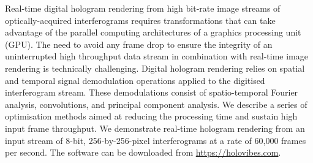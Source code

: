 Real-time digital hologram rendering from high bit-rate image streams of optically-acquired interferograms requires transformations that can take advantage of the parallel computing architectures of a graphics processing unit (GPU). The need to avoid any frame drop to ensure the integrity of an uninterrupted high throughput data stream in combination with real-time image rendering is technically challenging. Digital hologram rendering relies on spatial and temporal signal demodulation operations applied to the digitised interferogram stream. These demodulations consist of spatio-temporal Fourier analysis, convolutions, and principal component analysis. We describe a series of optimisation methods aimed at reducing the processing time and sustain high input frame throughput. We demonstrate real-time hologram rendering from an input stream of 8-bit, 256-by-256-pixel interferograms at a rate of 60,000 frames per second. The software can be downloaded from \href{https://holovibes.com}{https://holovibes.com}.